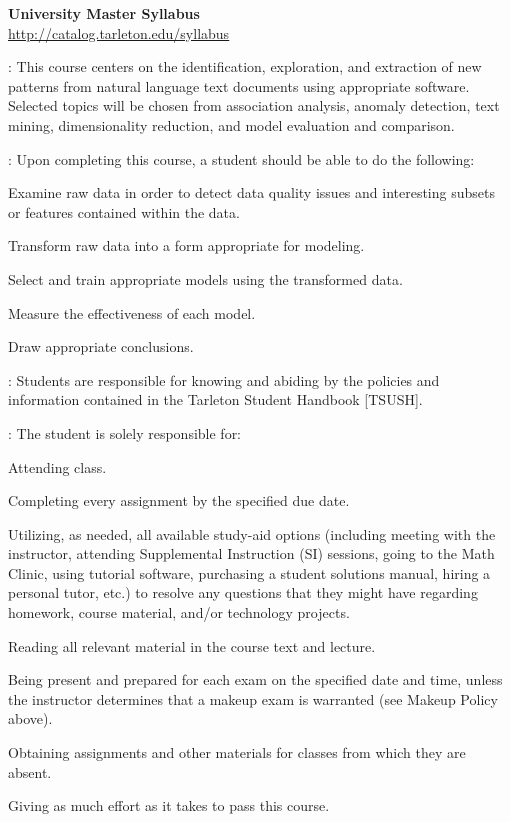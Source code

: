 \documentclass[letterpaper]{article}
\begin{document}
\hhrule
\begin{center}
\textbf{\LARGE{University Master Syllabus}}\\
\href{http://catalog.tarleton.edu/syllabus}{\underline{http://catalog.tarleton.edu/syllabus}}
\end{center}

\small
{}: This course centers on the identification, exploration, and extraction of new patterns from natural language text documents using appropriate software. Selected topics will be chosen from association analysis, anomaly detection, text mining, dimensionality reduction, and model evaluation and comparison.

: Upon completing this course, a student should be able to do the following: 
\ben[a)]
\item Examine raw data in order to detect data quality issues and interesting subsets or features contained within the data.
\item Transform raw data into a form appropriate for modeling.
\item Select and train appropriate models using the transformed data.
\item Measure the effectiveness of each model.
\item Draw appropriate conclusions.
\een

: Students are responsible for knowing and abiding by the policies and information contained in the Tarleton Student Handbook [TSUSH].

:  The student is solely responsible for:
\bit
	\item	Attending class.
	\item Completing every assignment by the specified due date.
	\item Utilizing, as needed, all available study-aid options (including meeting with the instructor, attending Supplemental Instruction (SI) sessions, going to the Math Clinic, using tutorial software, purchasing a student solutions manual, hiring a personal tutor, etc.) to resolve any questions that they might have regarding homework, course material, and/or technology projects.
	\item	Reading all relevant material in the course text and lecture.
	\item	Being present and prepared for each exam on the specified date and time, unless the instructor determines that a makeup exam is warranted (see Makeup Policy above).
  \item Obtaining assignments and other materials for classes from which they are absent.
  \item Giving as much effort as it takes to pass this course.
\eit
\end{document}
